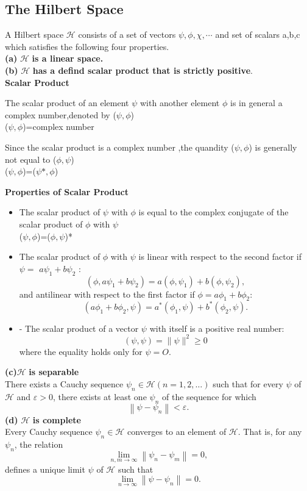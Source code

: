\subsection{The Hilbert Space}
A Hilbert space $\mathcal{H}$ consists of a set of vectors $\psi,\phi,\chi,\cdots$ and set of scalars a,b,c which satisfies the following four properties.\\
\textbf{(a)} $\mathcal{H}$ \textbf{is a linear space.}\\
\textbf{(b)} $\mathcal{H}$ \textbf{has a defind scalar product that is strictly positive}.\\
\textbf{Scalar Product}
  \par The scalar product of an element $\psi$ with another element $\phi$ is in general a complex number,denoted by ($\psi,\phi$) \\
  ($\psi,\phi$)=complex number
  \begin{note}
  	Since the scalar product is a complex number ,the quandity ($\psi,\phi$) is generally not equal to ($\phi,\psi$)\\
  	($\psi,\phi$)=($\psi*,\phi$)
  \end{note}
\textbf{Properties of Scalar Product}
\begin{itemize}
	\item The scalar product of $\psi$ with $\phi$ is equal to the complex conjugate of the scalar product of $\phi$ with $\psi$\\
	($\psi,\phi$)=($\phi,\psi$)*
	\item The scalar product of $\phi$ with $\psi$ is linear with respect to the second factor if $\psi=$ $a \psi_{1}+b \psi_{2}$ :
	$$
	\left(\phi, a \psi_{1}+b \psi_{2}\right)=a\left(\phi, \psi_{1}\right)+b\left(\phi, \psi_{2}\right),
	$$
	and antilinear with respect to the first factor if $\phi=a \phi_{1}+b \phi_{2}:$
	$$
	\left(a \phi_{1}+b \phi_{2}, \psi\right)=a^{*}\left(\phi_{1}, \psi\right)+b^{*}\left(\phi_{2}, \psi\right) .
	$$
	\item - The scalar product of a vector $\psi$ with itself is a positive real number:
	$$
	(\psi, \psi)=\|\psi\|^{2} \geq 0
	$$
	where the equality holds only for $\psi=O$.
\end{itemize}
\textbf{(c)}$\mathcal{H}$ \textbf{is separable}\\
There exists a Cauchy sequence $\psi_{n} \in \mathcal{H}(n=1,2, \ldots)$ such that for every $\psi$ of $\mathcal{H}$ and $\varepsilon>0$, there exists at least one $\psi_{n}$ of the sequence for which
$$
\left\|\psi-\psi_{n}\right\|<\varepsilon .
$$
\textbf{(d)} $\mathcal{H}$ \textbf{is complete}\\
Every Cauchy sequence $\psi_{n} \in \mathcal{H}$ converges to an element of $\mathcal{H}$. That is, for any $\psi_{n}$, the relation
$$
\lim _{n, m \rightarrow \infty}\left\|\psi_{n}-\psi_{m}\right\|=0,
$$
defines a unique limit $\psi$ of $\mathcal{H}$ such that
$$
\lim _{n \rightarrow \infty}\left\|\psi-\psi_{n}\right\|=0 .
$$

